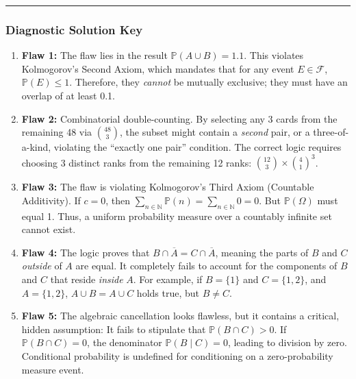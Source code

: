 \documentclass[11pt, letterpaper]{article}
\theoremstyle{definition}
\theoremstyle{remark}
\newcommand{\Prob}{\mathbb{P}}
\newcommand{\comp}[1]{\overline{#1}}
\begin{document}
\vspace{0.5cm}
\hrule
\vspace{0.5cm}

\subsubsection*{Diagnostic Solution Key}
\begin{enumerate}
    \item \textbf{Flaw 1:} The flaw lies in the result $\Prob(A \cup B) = 1.1$. This violates Kolmogorov's Second Axiom, which mandates that for any event $E \in \mathscr{F}$, $\Prob(E) \le 1$. Therefore, they \textit{cannot} be mutually exclusive; they must have an overlap of at least 0.1.
    \item \textbf{Flaw 2:} Combinatorial double-counting. By selecting any 3 cards from the remaining 48 via $\binom{48}{3}$, the subset might contain a \textit{second} pair, or a three-of-a-kind, violating the ``exactly one pair'' condition. The correct logic requires choosing 3 distinct ranks from the remaining 12 ranks: $\binom{12}{3} \times \binom{4}{1}^3$.
    \item \textbf{Flaw 3:} The flaw is violating Kolmogorov's Third Axiom (Countable Additivity). If $c = 0$, then $\sum_{n \in \mathbb{N}} \Prob(n) = \sum_{n \in \mathbb{N}} 0 = 0$. But $\Prob(\Omega)$ must equal 1. Thus, a uniform probability measure over a countably infinite set cannot exist.
    \item \textbf{Flaw 4:} The logic proves that $B \cap \comp{A} = C \cap \comp{A}$, meaning the parts of $B$ and $C$ \textit{outside} of $A$ are equal. It completely fails to account for the components of $B$ and $C$ that reside \textit{inside} $A$. For example, if $B = \{1\}$ and $C = \{1, 2\}$, and $A = \{1, 2\}$, $A \cup B = A \cup C$ holds true, but $B \neq C$.
    \item \textbf{Flaw 5:} The algebraic cancellation looks flawless, but it contains a critical, hidden assumption: It fails to stipulate that $\Prob(B \cap C) > 0$. If $\Prob(B \cap C) = 0$, the denominator $\Prob(B \mid C) = 0$, leading to division by zero. Conditional probability is undefined for conditioning on a zero-probability measure event.
\end{enumerate}
\end{document}
